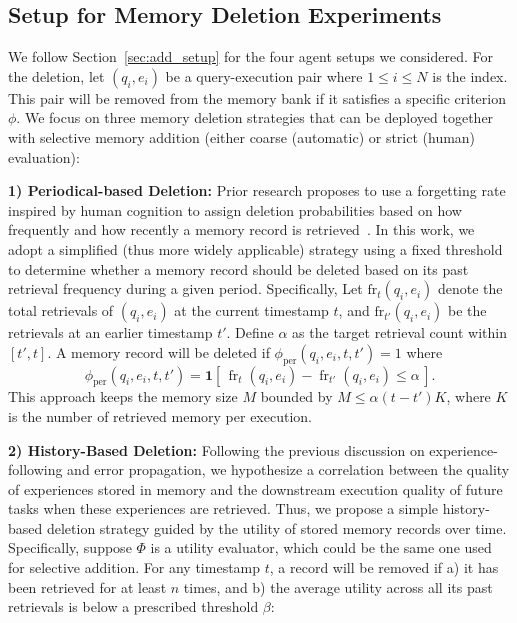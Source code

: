 \documentclass[11pt]{article}
\theoremstyle{plain}
\theoremstyle{definition}
\begin{document}
\subsection{Setup for Memory Deletion Experiments}
\label{sec:deletion_setup}
We follow Section~\ref{sec:add_setup} for the four agent setups we considered.
For the deletion, let \((q_i, e_i)\) be a query-execution pair where \(1 \le i \le N\) is the index. This pair will be removed from the memory bank if it satisfies a specific criterion \(\phi\). We focus on three memory deletion strategies that can be deployed together with selective memory addition (either coarse (automatic) or strict (human) evaluation):

\textbf{1) Periodical-based Deletion:}
Prior research proposes to use a forgetting rate inspired by human cognition to assign deletion probabilities based on how frequently and how recently a memory record is retrieved~\cite{zhong2024memorybank,hou2024my,wang2024trove}. In this work, we adopt a simplified (thus more widely applicable) strategy using a fixed threshold to determine whether a memory record should be deleted based on its past retrieval frequency during a given period.
Specifically, 
Let \(\text{fr}_{t}(q_i, e_i)\) denote the total retrievals of \((q_i, e_i)\) at the current timestamp \(t\), and \(\text{fr}_{t'}(q_i, e_i)\) be the retrievals at an earlier timestamp \(t'\). Define \(\alpha\) as the target retrieval count within \([t', t]\). A memory record will be deleted if \(\phi_{\text{per}}(q_i, e_i, t, t') = 1\) where
\[
\phi_{\text{per}}(q_i, e_i, t, t') 
= \mathbf{1}\!\left[\, 
\operatorname{fr}_{t}(q_i, e_i) - \operatorname{fr}_{t'}(q_i, e_i) 
\le \alpha 
\,\right].
\]
This approach keeps the memory size $M$ bounded {by $M \le\alpha(t - t') K$, where $K$ is the number of retrieved memory per execution}.

\textbf{2) History-Based Deletion:}
{
Following the previous discussion on experience-following and error propagation, we hypothesize a correlation between the quality of experiences stored in memory and the downstream execution quality of future tasks when these experiences are retrieved.}
Thus, we propose a simple history-based deletion strategy guided by the 
utility of stored memory records over time. 
Specifically, suppose \(\Phi\) is a utility evaluator, which could be the same one used for selective addition.
For any timestamp $t$, a record will be removed if a) it has been retrieved for at least $n$ times, and b) the average utility across all its past retrievals is below a prescribed threshold \(\beta\):
\end{document}
